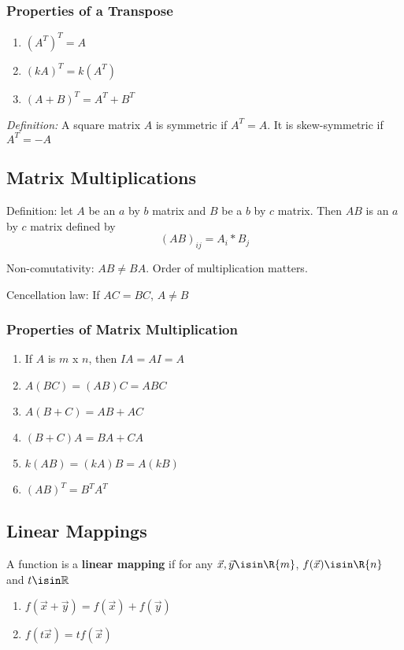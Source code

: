 \documentclass[12pt]{article}
\begin{document}
\subsubsection*{Properties of a Transpose}
\begin{enumerate}
\item $(A^T)^T = A$
\item $(kA)^T = k(A^T)$
\item $(A+B)^T = A^T + B^T$
\end{enumerate}

\textit{Definition:} A square matrix $A$ is symmetric if $A^T = A$. It is skew-symmetric if $A^T = -A$

\subsection*{Matrix Multiplications}
Definition: let $A$ be an $a$ by $b$ matrix and $B$ be a $b$ by $c$ matrix. Then $AB$ is an $a$ by $c$ matrix defined by \[ (AB)_{ij} = A_i * B_j \]

Non-comutativity: $AB \neq BA$. Order of multiplication matters.

Cencellation law: If $AC = BC$, $A \neq B$

\subsubsection*{Properties of Matrix Multiplication}
\begin{enumerate}
\item If $A$ is $m$ x $n$, then $IA = AI = A$
\item $A(BC) = (AB)C = ABC$
\item $A(B+C) = AB + AC$
\item $(B+C)A = BA + CA$
\item $k(AB) = (kA)B = A(kB)$
\item $(AB)^T = B^TA^T$
\end{enumerate}

\subsection*{Linear Mappings}
A function is a {\bf linear mapping} if for any $\vec{x}, \vec{y}\isin\R{m}$, $f(\vec{x})\isin\R{n}$ and $t\isin\mathbb{R}$
\begin{enumerate}
\item $f(\vec{x} + \vec{y}) = f(\vec{x}) + f(\vec{y})$
\item $f(t\vec{x}) = tf(\vec{x})$
\end{enumerate}
\end{document}
